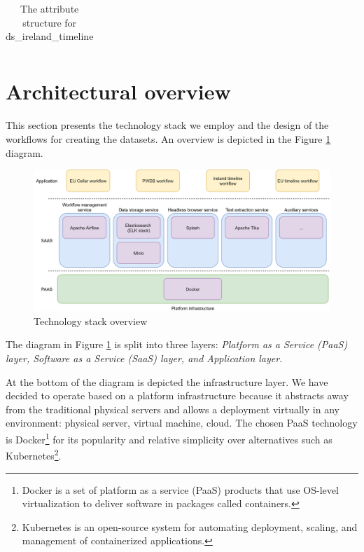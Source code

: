 {\begin{longtable}{p{1.16in}p{3.48in}p{0.62in}}

\caption{The attribute structure for ds\_ireland\_timeline}
\label{tab:dsirelandtimeline}

\end{longtable}}

\section{Architectural overview}

This section presents the technology stack we employ and the design of the workflows for creating the datasets. An overview is depicted in the Figure \ref{fig:Technology_stack_overview} diagram.


\begin{figure}[h]
	\begin{Center}
		\includegraphics[width=\textwidth]{images/image3.png}
		\caption{Technology stack overview}
		\label{fig:Technology_stack_overview}
	\end{Center}
\end{figure}

The diagram in Figure \ref{fig:Technology_stack_overview} is split into three layers: \textit{Platform as a Service (PaaS) layer, Software as a Service (SaaS) layer, and Application layer}. 

\enlargethispage{2em}

At the bottom of the diagram is depicted the infrastructure layer. We have decided to operate based on a platform infrastructure because it abstracts away from the traditional physical servers and allows a deployment virtually in any environment: physical server, virtual machine, cloud. The chosen PaaS technology is Docker\footnote{ Docker is a set of platform as a service (PaaS) products that use OS-level virtualization to deliver software in packages called containers. } for its popularity and relative simplicity over alternatives such as Kubernetes\footnote{ Kubernetes is an open-source system for automating deployment, scaling, and management of containerized applications. }. 

